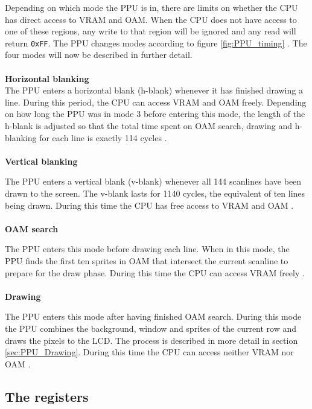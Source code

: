 Depending on which mode the PPU is in, there are limits on whether the CPU has direct access to VRAM and OAM. When the CPU does not have access to one of these regions, any write to that region will be ignored and any read will return \texttt{0xFF}. The PPU changes modes according to figure \ref{fig:PPU_timing} \cite{pandocsVideo}. The four modes will now be described in further detail.\\
\\
\textbf{Horizontal blanking}
\\
The PPU enters a horizontal blank (h-blank) whenever it has finished drawing a line. During this period, the CPU can access VRAM and OAM freely. Depending on how long the PPU was in mode 3 before entering this mode, the length of the h-blank is adjusted so that the total time spent on OAM search, drawing and h-blanking for each line is exactly 114 cycles \cite{pandocsVideo}.\\
\\
\textbf{Vertical blanking}

The PPU enters a vertical blank (v-blank) whenever all 144 scanlines have been drawn to the screen. The v-blank lasts for 1140 cycles, the equivalent of ten lines being drawn. During this time the CPU has free access to VRAM and OAM \cite{pandocsVideo}.\\
\\
\textbf{OAM search}

The PPU enters this mode before drawing each line. When in this mode, the PPU finds the first ten sprites in OAM that intersect the current scanline to prepare for the draw phase. During this time the CPU can access VRAM freely \cite{pandocsVideo}. \\
\\
\textbf{Drawing}

The PPU enters this mode after having finished OAM search. During this mode the PPU combines the background, window and sprites of the current row and draws the pixels to the LCD. The process is described in more detail in section \ref{sec:PPU_Drawing}. During this time the CPU can access neither VRAM nor OAM \cite{pandocsVideo}. 

\subsection{The registers}
\label{sec:PPU_Registers}


